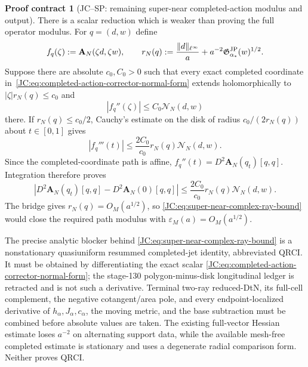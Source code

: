 \documentclass[11pt]{amsart}
\numberwithin{equation}{section}
\theoremstyle{definition}
\newtheorem{contract}[theorem]{Proof contract}
\theoremstyle{remark}
\newcommand{\Gjp}{\mathfrak G^{\rm JP}}
\begin{document}
\begin{contract}[JC--SP: remaining super-near completed-action modulus and output]
There is a scalar reduction which is weaker than proving the full operator
modulus.  For $q=(d,w)$ define
\[
 f_q(\zeta):=\mathbf A_N(\zeta d,\zeta w),\qquad
 r_N(q):=\frac{\|d\|_{\ell^\infty}}a
 +a^{-2}\Gjp_{\alpha_*}(w)^{1/2}.
\]
Suppose there are absolute $c_0,C_0>0$ such that every exact completed
coordinate in~\eqref{JC:eq:completed-action-corrector-normal-form} extends
holomorphically to $|\zeta|r_N(q)\le c_0$ and
\begin{equation}\label{JC:eq:super-near-complex-ray-bound}
 \boxed{|f_q''(\zeta)|\le C_0\mathcal N_N(d,w)}
\end{equation}
there.  If $r_N(q)\le c_0/2$, Cauchy's estimate on the disk of radius
$c_0/(2r_N(q))$ about $t\in[0,1]$ gives
\[
 |f_q'''(t)|\le\frac{2C_0}{c_0}r_N(q)\mathcal N_N(d,w).
\]
Since the completed-coordinate path is affine,
$f_q''(t)=D^2\mathbf A_N(q_t)[q,q]$.  Integration therefore proves
\begin{equation}\label{JC:eq:super-near-Cauchy-output}
 \boxed{
 |D^2\mathbf A_N(q_t)[q,q]-D^2\mathbf A_N(0)[q,q]|
 \le\frac{2C_0}{c_0}r_N(q)\mathcal N_N(d,w).}
\end{equation}
The bridge gives $r_N(q)=O_M(a^{1/2})$, so
\eqref{JC:eq:super-near-complex-ray-bound} would close the required path
modulus with $\varepsilon_M(a)=O_M(a^{1/2})$.

The precise analytic blocker behind
\eqref{JC:eq:super-near-complex-ray-bound} is a nonstationary quasiuniform
resummed completed-jet identity, abbreviated QRCI.  It must be obtained by
differentiating the exact scalar
\eqref{JC:eq:completed-action-corrector-normal-form}; the stage-130
polygon-minus-disk longitudinal ledger is retracted and is not such a
derivative.  Terminal two-ray reduced-DtN, its full-cell complement, the
negative cotangent/area pole, and every endpoint-localized derivative of
$h_\alpha,J_\alpha,c_\alpha$, the moving metric, and the base subtraction
must be combined before absolute values are taken.  The existing
full-vector Hessian estimate loses $a^{-2}$ on alternating support data,
while the available mesh-free completed estimate is stationary and uses a
degenerate radial comparison form.  Neither proves QRCI.


\end{contract}
\end{document}
